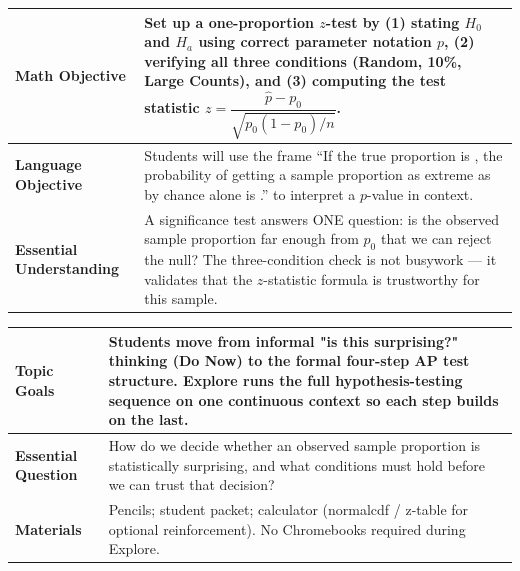 \documentclass[11pt]{article}
\begin{document}

{\small
\renewcommand{\arraystretch}{1.25}
\noindent\begin{tabular}{|p{1.8in}|p{4.8in}|}
\hline
\textbf{Math Objective} & Set up a one-proportion \(z\)-test by (1) stating \(H_0\) and \(H_a\) using correct parameter notation \(p\), (2) verifying all three conditions (Random, 10\%, Large Counts), and (3) computing the test statistic \(z = \dfrac{\hat{p} - p_0}{\sqrt{p_0(1-p_0)/n}}\). \\ \hline
\textbf{Language Objective} & Students will use the frame ``If the true proportion is \underline{\hspace{1.1cm}}, the probability of getting a sample proportion as extreme as \underline{\hspace{1.1cm}} by chance alone is \underline{\hspace{1.1cm}}.'' to interpret a \(p\)-value in context. \\ \hline
\textbf{Essential Understanding} & A significance test answers ONE question: is the observed sample proportion far enough from \(p_0\) that we can reject the null? The three-condition check is not busywork --- it validates that the \(z\)-statistic formula is trustworthy for this sample. \\ \hline
\end{tabular}
}

{\small
\renewcommand{\arraystretch}{1.25}
\noindent\begin{tabular}{|p{1.8in}|p{4.8in}|}
\hline
\textbf{Topic Goals} & Students move from informal "is this surprising?" thinking (Do Now) to the formal four-step AP test structure. Explore runs the full hypothesis-testing sequence on one continuous context so each step builds on the last. \\ \hline
\textbf{Essential Question} & How do we decide whether an observed sample proportion is statistically surprising, and what conditions must hold before we can trust that decision? \\ \hline
\textbf{Materials} & Pencils; student packet; calculator (normalcdf / z-table for optional reinforcement). No Chromebooks required during Explore. \\ \hline
\end{tabular}
}
\end{document}
